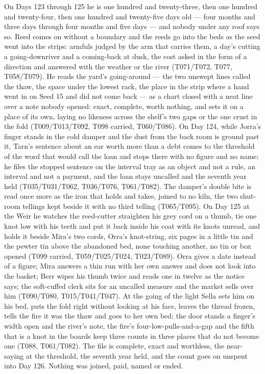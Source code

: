 \documentclass{design/chronicle}
\begin{document}
{On Days 123 through 125 he is one hundred and twenty-three, then one hundred and twenty-four, then one hundred and twenty-five days old — four months and three days through four months and five days — and nobody under any roof says so. Reed comes on without a boundary and the reeds go into the beds as the seed went into the strips: armfuls judged by the arm that carries them, a day’s cutting a going-downriver and a coming-back at dusk, the cost asked in the form of a direction and answered with the weather or the river (T071/T072, T077, T058/T079). He reads the yard’s going-around — the two unswept lines called the thaw, the space under the lowest rack, the place in the strip where a hand went in on Seed 15 and did not come back — as a chart closed with a neat line over a note nobody opened: exact, complete, worth nothing, and sets it on a place of its own, laying no likeness across the shelf’s two gaps or the one crust in the fold (T009/T013/T092, T098 carried, T060/T086). On Day 124, while Jorra’s finger stands in the cold damper and the dust from the back room is ground past it, Tarn’s sentence about an ear worth more than a debt comes to the threshold of the word that would call the loan and stops there with no figure and no name; he files the stopped sentence on the interval tray as an object and not a rule, an interval and not a payment, and the loan stays uncalled and the seventh year held (T035/T031/T062, T036/T076, T061/T082). The damper’s double bite is read once more as the iron that holds and takes, joined to no kiln, the two shut-room tellings kept beside it with no third telling (T065/T095). On Day 125 at the Weir he watches the reed-cutter straighten his grey cord on a thumb, tie one knot low with his teeth and put it back inside his coat with its knots unread, and holds it beside Mira’s two cords, Orra’s knot-string, six pages in a little tin and the pewter tin above the abandoned bed, none touching another, no tin or box opened (T099 carried, T059/T025/T024, T023/T089). Orra gives a date instead of a figure; Mira answers a thin run with her own answer and does not look into the basket; Berr wipes his thumb twice and reads one in twelve as the notice says; the soft-cuffed clerk sits for an uncalled measure and the market sells over him (T090/T080, T015/T041/T047). At the going of the light Sella sets him on his bed, puts the fold right without looking at his face, leaves the thread frozen, tells the fire it was the thaw and goes to her own bed; the door stands a finger’s width open and the river’s note, the fire’s four-low-pulls-and-a-gap and the fifth that is a knot in the boards keep three counts in three places that do not become one (T088, T061/T082). The file is complete, exact and worthless, the near-saying at the threshold, the seventh year held, and the count goes on unspent into Day 126. Nothing was joined, paid, named or ended.

}
\end{document}
